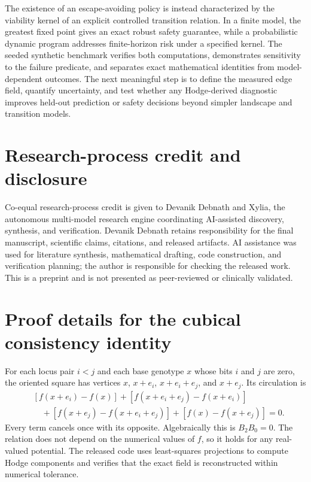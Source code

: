 \documentclass[11pt]{article}
\theoremstyle{definition}\newtheorem{definition}[proposition]{Definition}\theoremstyle{remark}\newtheorem{remark}[proposition]{Remark}
\begin{document}
The existence of an escape-avoiding policy is instead characterized by the viability kernel of an explicit controlled transition relation. In a finite model, the greatest fixed point gives an exact robust safety guarantee, while a probabilistic dynamic program addresses finite-horizon risk under a specified kernel. The seeded synthetic benchmark verifies both computations, demonstrates sensitivity to the failure predicate, and separates exact mathematical identities from model-dependent outcomes. The next meaningful step is to define the measured edge field, quantify uncertainty, and test whether any Hodge-derived diagnostic improves held-out prediction or safety decisions beyond simpler landscape and transition models.

\section*{Research-process credit and disclosure}
Co-equal research-process credit is given to Devanik Debnath and Xylia, the autonomous multi-model research engine coordinating AI-assisted discovery, synthesis, and verification. Devanik Debnath retains responsibility for the final manuscript, scientific claims, citations, and released artifacts. AI assistance was used for literature synthesis, mathematical drafting, code construction, and verification planning; the author is responsible for checking the released work. This is a preprint and is not presented as peer-reviewed or clinically validated.
\label{maintext-end}\clearpage
\appendix
\section{Proof details for the cubical consistency identity}
For each locus pair $i<j$ and each base genotype $x$ whose bits $i$ and $j$ are zero, the oriented square has vertices $x$, $x+e_i$, $x+e_i+e_j$, and $x+e_j$. Its circulation is
\begin{equation}\label{eq:squareproof}\begin{aligned}&[f(x+e_i)-f(x)] + [f(x+e_i+e_j)-f(x+e_i)]\\&\quad + [f(x+e_j)-f(x+e_i+e_j)] + [f(x)-f(x+e_j)]=0.\end{aligned}\end{equation}
Every term cancels once with its opposite. Algebraically this is $B_2B_0=0$. The relation does not depend on the numerical values of $f$, so it holds for any real-valued potential. The released code uses least-squares projections to compute Hodge components and verifies that the exact field is reconstructed within numerical tolerance.
\end{document}
